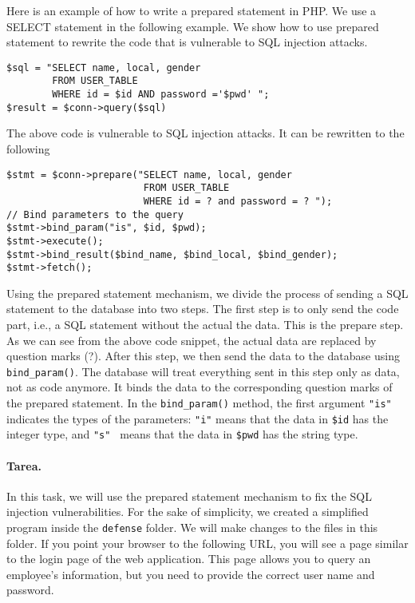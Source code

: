 Here is an example of how to write a prepared statement in PHP.  We use a SELECT statement in
the following example.  We show how to use prepared statement to rewrite the code that is
vulnerable to SQL injection attacks.


\begin{lstlisting}
$sql = "SELECT name, local, gender  
        FROM USER_TABLE 
        WHERE id = $id AND password ='$pwd' ";
$result = $conn->query($sql)
\end{lstlisting}

The above code is vulnerable to SQL injection attacks. 
It can be rewritten to the following


\begin{lstlisting}
$stmt = $conn->prepare("SELECT name, local, gender
                        FROM USER_TABLE 
                        WHERE id = ? and password = ? ");
// Bind parameters to the query
$stmt->bind_param("is", $id, $pwd);
$stmt->execute();
$stmt->bind_result($bind_name, $bind_local, $bind_gender);
$stmt->fetch();
\end{lstlisting}


Using the prepared statement mechanism, we divide the process of sending
a SQL statement to the database into two steps.  
The first step is to only send the code part, i.e., a SQL statement without 
the actual the data. This is the prepare step. As we can see from the 
above code snippet, the actual data are replaced by question
marks (?).  After this step, we then send the data to the database using 
{\tt bind\_param()}.
The database will treat everything sent in this step only as 
data, not as code anymore. It binds the data to the corresponding
question marks of the prepared statement. 
In the {\tt bind\_param()} method, the first argument {\tt "is"} indicates
the types of the parameters: \texttt{"i"} means  
that the data in {\tt \$id} has the integer type,
and \texttt{"s" } means that the data in {\tt \$pwd} has the string type.


\paragraph{Tarea.} In this task, we will use the prepared statement mechanism to 
fix the SQL injection vulnerabilities. For the sake of simplicity, we 
created a simplified program inside the \texttt{defense} folder. We 
will make changes to the files in this folder. 
If you point your browser to the following URL, you will see a page similar
to the login page of the web application. This page allows you to query an 
employee's information, but you need to provide the correct 
user name and password. 


